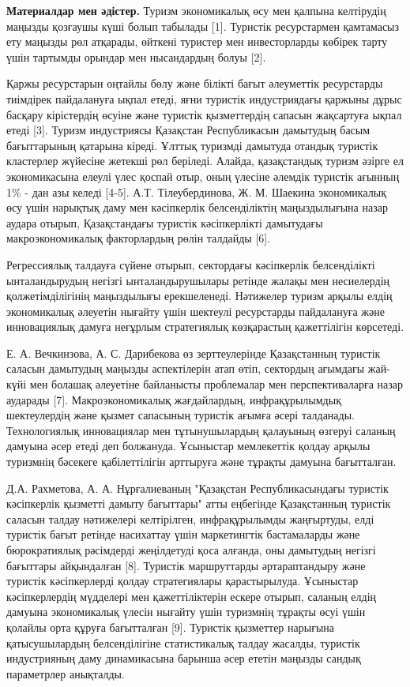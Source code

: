 \begin{multicols}{2}
{\bfseries Материалдар мен әдістер.} Туризм экономикалық өсу мен қалпына
келтірудің маңызды қозғаушы күші болып табылады {[}1{]}. Туристік
ресурстармен қамтамасыз ету маңызды рөл атқарады, өйткені туристер мен
инвесторларды көбірек тарту үшін тартымды орындар мен нысандардың болуы
{[}2{]}.

Қаржы ресурстарын оңтайлы бөлу және білікті бағыт әлеуметтік ресурстарды
тиімдірек пайдалануға ықпал етеді, яғни туристік индустриядағы қаржыны
дұрыс басқару кірістердің өсуіне және туристік қызметтердің сапасын
жақсартуға ықпал етеді {[}3{]}. Туризм индустриясы Қазақстан
Республикасын дамытудың басым бағыттарының қатарына кіреді. Ұлттық
туризмді дамытуда отандық туристік кластерлер жүйесіне жетекші рөл
беріледі. Алайда, қазақстандық туризм әзірге ел экономикасына елеулі
үлес қоспай отыр, оның үлесіне әлемдік туристік ағынның 1\% - дан азы
келеді {[}4-5{]}. А.Т. Тілеубердинова, Ж. М. Шаекина экономикалық өсу
үшін нарықтық даму мен кәсіпкерлік белсенділіктің маңыздылығына назар
аудара отырып, Қазақстандағы туристік кәсіпкерлікті дамытудағы
макроэкономикалық факторлардың рөлін талдайды {[}6{]}.

Регрессиялық талдауға сүйене отырып, сектордағы кәсіпкерлік
белсенділікті ынталандырудың негізгі ынталандырушылары ретінде жалақы
мен несиелердің қолжетімділігінің маңыздылығы ерекшеленеді. Нәтижелер
туризм арқылы елдің экономикалық әлеуетін нығайту үшін шектеулі
ресурстарды пайдалануға және инновациялық дамуға неғұрлым стратегиялық
көзқарастың қажеттілігін көрсетеді.

Е. А. Вечкинзова, А. С. Дарибекова өз зерттеулерінде Қазақстанның
туристік саласын дамытудың маңызды аспектілерін атап өтіп, сектордың
ағымдағы жай-күйі мен болашақ әлеуетіне байланысты проблемалар мен
перспективаларға назар аударады {[}7{]}. Макроэкономикалық жағдайлардың,
инфрақұрылымдық шектеулердің және қызмет сапасының туристік ағымға әсері
талданады. Технологиялық инновациялар мен тұтынушылардың қалауының
өзгеруі саланың дамуына әсер етеді деп болжануда. Ұсыныстар мемлекеттік
қолдау арқылы туризмнің бәсекеге қабілеттілігін арттыруға және тұрақты
дамуына бағытталған.

Д.А. Рахметова, А. А. Нұрғалиеваның "Қазақстан Республикасындағы
туристік кәсіпкерлік қызметті дамыту бағыттары" атты еңбегінде
Қазақстанның туристік саласын талдау нәтижелері келтірілген,
инфрақұрылымды жаңғыртуды, елді туристік бағыт ретінде насихаттау үшін
маркетингтік бастамаларды және бюрократиялық рәсімдерді жеңілдетуді қоса
алғанда, оны дамытудың негізгі бағыттары айқындалған {[}8{]}. Туристік
маршруттарды әртараптандыру және туристік кәсіпкерлерді қолдау
стратегиялары қарастырылуда. Ұсыныстар кәсіпкерлердің мүдделері мен
қажеттіліктерін ескере отырып, саланың елдің дамуына экономикалық үлесін
нығайту үшін туризмнің тұрақты өсуі үшін қолайлы орта құруға бағытталған
{[}9{]}. Туристік қызметтер нарығына қатысушылардың белсенділігіне
статистикалық талдау жасалды, туристік индустрияның даму динамикасына
барынша әсер ететін маңызды сандық параметрлер анықталды.


\end{multicols}
